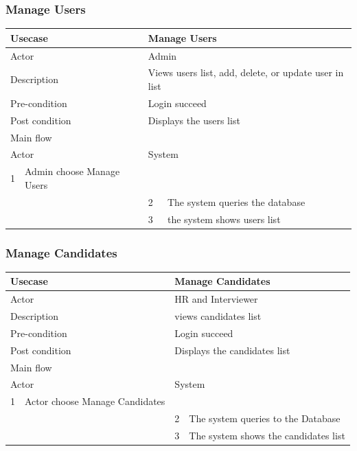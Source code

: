 \documentclass[a4paper]{article}
\begin{document}
\subsubsection{Manage Users}
\begin{tabular}{|l|p{5cm}||l|p{5cm}|}
	\hline 
	\multicolumn{2}{|p{5cm}|}{Usecase} & \multicolumn{2}{|p{5cm}|}{Manage Users}\\ 
	\hline 
	\multicolumn{2}{|p{5cm}|}{Actor} & \multicolumn{2}{|p{5cm}|}{Admin} \\ 
	\hline 
	\multicolumn{2}{|p{5cm}|}{Description} & \multicolumn{2}{|p{5cm}|}{Views users list, add, delete, or update user in list}\\
	\hline
	\multicolumn{2}{|p{5cm}|}{Pre-condition} & \multicolumn{2}{|p{5cm}|}{Login succeed}\\
	\hline
	\multicolumn{2}{|p{5cm}|}{Post condition} & \multicolumn{2}{|p{5cm}|}{Displays the users list} \\
	\hline
	\multicolumn{4}{|l|}{Main flow} \\
	\hline
	\multicolumn{2}{|p{5cm}|}{Actor} & \multicolumn{2}{|p{5cm}|}{System} \\
	\hline
	1 & Admin choose Manage Users & & \\
	\hline
	& & 2 & The system queries the database \\
	\hline 
	& & 3 & the system shows users list  \\
	\hline		
\end{tabular}

\subsubsection{Manage Candidates}
\begin{tabular}{|l|p{5cm}||l|p{5cm}|}
	\hline 
	\multicolumn{2}{|p{5cm}|}{Usecase} & \multicolumn{2}{|p{5cm}|}{Manage Candidates}\\ 
	\hline 
	\multicolumn{2}{|p{5cm}|}{Actor} & \multicolumn{2}{|p{5cm}|}{HR and Interviewer} \\ 
	\hline 
	\multicolumn{2}{|p{5cm}|}{Description} & \multicolumn{2}{|p{5cm}|}{views candidates list}\\
	\hline
	\multicolumn{2}{|p{5cm}|}{Pre-condition} & \multicolumn{2}{|p{5cm}|}{Login succeed}\\
	\hline
	\multicolumn{2}{|p{5cm}|}{Post condition} & \multicolumn{2}{|p{5cm}|}{Displays the candidates list} \\
	\hline
	\multicolumn{4}{|l|}{Main flow} \\
	\hline
	\multicolumn{2}{|p{5cm}|}{Actor} & \multicolumn{2}{|p{5cm}|}{System} \\
	\hline
	1 & Actor choose Manage Candidates & & \\
	\hline
	& & 2 & The system queries to the Database \\
	\hline 
	& & 3 & The system shows the candidates list  \\
	\hline
\end{tabular}
\end{document}
